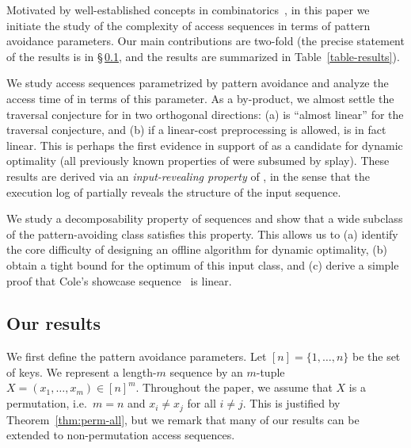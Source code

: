 Motivated by well-established concepts in combinatorics~\cite{knuth68,Vatter,kitaev}, in this paper  
we initiate the study of the complexity of access sequences in terms of pattern avoidance parameters.  
Our main contributions are two-fold (the precise statement of the results is in \S\,\ref{sec:results}, and the results are summarized in Table~\ref{table-results}). 

\begin{compactenum}[(i)] 
\item We study access sequences parametrized by pattern avoidance and analyze the access time of \greedy in terms of this parameter. 
As a by-product, we almost settle the traversal conjecture for \greedy in two orthogonal directions: (a) \greedy is ``almost linear'' for the traversal conjecture, and (b) if a linear-cost preprocessing is allowed, \greedy is in fact linear.  
This is perhaps the first evidence in support of \greedy as a candidate for dynamic optimality (all previously known properties of \greedy were subsumed by splay). 
These results are derived via an {\em input-revealing property} of \greedy, in the sense that the execution log of \greedy partially reveals the structure of the input sequence.  

\item We study a decomposability property of sequences and show that a wide subclass of the pattern-avoiding class satisfies this property. 
This allows us to (a) identify the core difficulty of designing an offline algorithm for dynamic optimality, (b) obtain a tight bound for the optimum of this input class, and (c) derive a simple proof that Cole's showcase sequence~\cite{finger1} is linear.    
 
\end{compactenum} 

\subsection{Our results }
\label{sec:results}

We first define the pattern avoidance parameters. 
Let $[n] = \{1,\dots,n\}$ be the set of keys. 
We represent a length-$m$ sequence by an $m$-tuple $X = (x_1,\ldots, x_m) \in [n]^m$. 
Throughout the paper, we assume that %
$X$ is a permutation, i.e.\ $m=n$ and $x_i \neq x_j$ for all $i \neq j$. This is justified by Theorem~\ref{thm:perm-all}, but we remark that many of our results can be extended to non-permutation access sequences.

